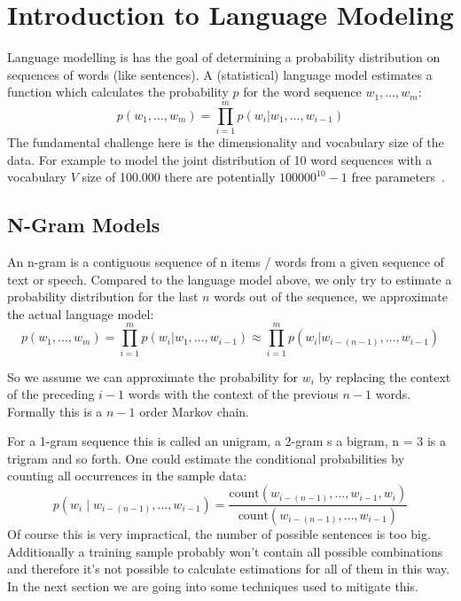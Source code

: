 
\section{Introduction to Language Modeling}
\label{sec:language-modeling}

Language modelling is has the goal of determining a probability distribution on sequences of words (like sentences).
A (statistical) language model estimates a function which calculates the probability $p$ for the word sequence $w_1,\dots,w_m$:
\[
    p(w_1,\dots,w_m) = \prod_{i=1}^{m} p(w_i | w_1,\dots,w_{i-1})
\]
The fundamental challenge here is the dimensionality and vocabulary size of the data. For example to model the joint distribution
of 10 word sequences with a vocabulary $V$ size of 100.000 there are potentially $100000^{10} - 1$ 
free parameters~\cite{Bengio:2003:NPL:944919.944966}. 

\subsection{N-Gram Models}
\label{subsec:n-gram}

An n-gram is a contiguous sequence of n items / words from a given sequence of text or speech. Compared to the language model above,
we only try to estimate a probability distribution for the last $n$ words out of the sequence, we approximate the actual language model:
\[
p(w_1,\dots,w_m) = \prod_{i=1}^{m} p(w_i | w_1,\dots,w_{i-1}) \approx \prod_{i=1}^{m} p(w_i | w_{i-(n-1)},\dots,w_{i-1})
\]

So we assume we can approximate the probability for $w_i$ by replacing the context of the preceding $i - 1$ words with 
the context of the previous $n - 1$ words. Formally this is a $n - 1$ order Markov chain. %

For a 1-gram sequence this is called an unigram, a 2-gram s a bigram, n = 3 is a trigram and so forth.
One could estimate the conditional probabilities by counting all occurrences in the sample data:
\[
p(w_i\mid w_{i-(n-1)},\ldots,w_{i-1}) = \frac{\mathrm{count}(w_{i-(n-1)},\ldots,w_{i-1},w_i)}{\mathrm{count}(w_{i-(n-1)},\ldots,w_{i-1})}
\]
Of course this is very impractical, the number of possible sentences is too big. Additionally a training sample probably 
won't contain all possible combinations and therefore it's not possible to calculate estimations for all of them in this way.
In the next section we are going into some techniques used to mitigate this.

